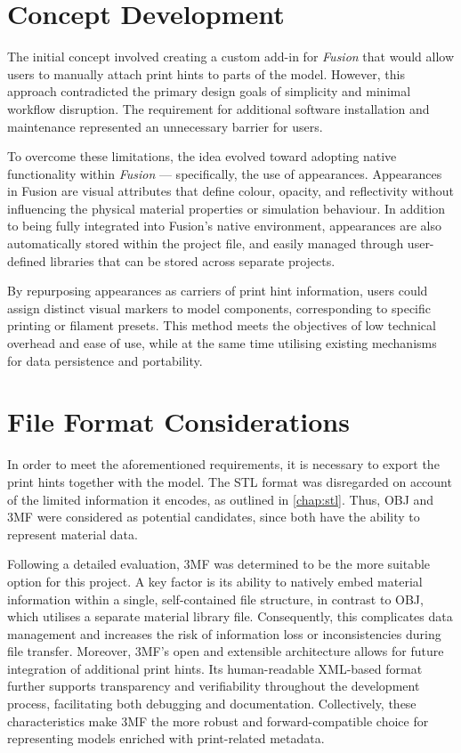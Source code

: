 \section{Concept Development}

The initial concept involved creating a custom add-in for \textit{Fusion} that would allow users to manually attach print hints to parts of the model. 
However, this approach contradicted the primary design goals of simplicity and minimal workflow disruption. 
The requirement for additional software installation and maintenance represented an unnecessary barrier for users.

To overcome these limitations, the idea evolved toward adopting native functionality within \textit{Fusion} — specifically, the use of appearances. 
Appearances in Fusion are visual attributes that define colour, opacity, and reflectivity without influencing the physical material properties or simulation behaviour. 
In addition to being fully integrated into Fusion’s native environment, appearances are also automatically stored within the project file, and easily managed through user-defined libraries that can be stored across separate projects.

By repurposing appearances as carriers of print hint information, users could assign distinct visual markers to model components, corresponding to specific printing or filament presets. 
This method meets the objectives of low technical overhead and ease of use, while at the same time utilising existing mechanisms for data persistence and portability.


\section{File Format Considerations}

In order to meet the aforementioned requirements, it is necessary to export the print hints together with the model. 
The STL format was disregarded on account of the limited information it encodes, as outlined in \ref{chap:stl}. 
Thus, OBJ and 3MF were considered as potential candidates, since both have the ability to represent material data. 

Following a detailed evaluation, 3MF was determined to be the more suitable option for this project. 
A key factor is its ability to natively embed material information within a single, self-contained file structure, in contrast to OBJ, which utilises a separate material library file.
Consequently, this complicates data management and increases the risk of information loss or inconsistencies during file transfer. 
Moreover, 3MF’s open and extensible architecture allows for future integration of additional print hints.
Its human-readable XML-based format further supports transparency and verifiability throughout the development process, facilitating both debugging and documentation.
Collectively, these characteristics make 3MF the more robust and forward-compatible choice for representing models enriched with print-related metadata.


